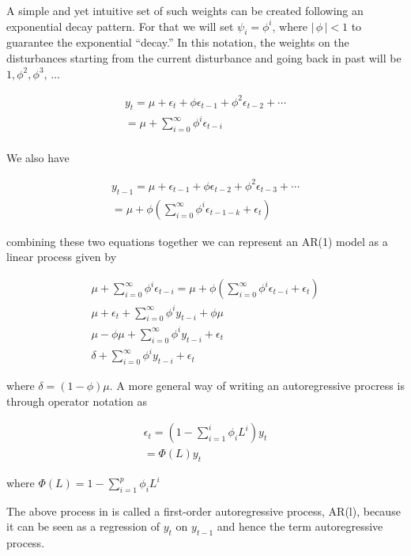 \documentclass[
  11pt,
]{article}
\begin{document}
A simple and yet intuitive set of such weights can be created following
an exponential decay pattern. For that we will set
\(\psi_{i} = \phi^{i}\), where \(\left|\,\phi\,\right| < 1\) to
guarantee the exponential ``decay.'' In this notation, the weights on
the disturbances starting from the current disturbance and going back in
past will be \(1, \phi^{2}, \phi^{3},\, \ldots\)

\begin{gather*}
y_{t} = \mu + \epsilon_{t} + \phi\epsilon_{t-1} + \phi^{2}\epsilon_{t-2} + \cdots\\[8pt]
= \mu + \sum\limits_{i=0}^{\infty}\phi^{i}\epsilon_{t-i}
\\[8pt]
\end{gather*}

We also have

\begin{gather*}
y_{t-1} = \mu + \epsilon_{t-1} + \phi\epsilon_{t-2} + \phi^{2}\epsilon_{t-3} + \cdots \\[8pt]
= \mu + \phi\left(\sum\limits_{i=0}^{\infty}\phi^{i}\epsilon_{t-1-k} + \epsilon_{t}\right)
\end{gather*}

combining these two equations together we can represent an AR(1) model
as a linear process given by

\begin{gather*}
\mu + \sum\limits_{i=0}^{\infty}\phi^{i}\epsilon_{t-i} = \mu + \phi\left(\sum\limits_{i=0}^{\infty}\phi^{i}\epsilon_{t-i} + \epsilon_{t}\right) \\[8pt]
\mu + \epsilon_{t} + \sum\limits_{i=0}^{\infty}\phi^{i}y_{t-i} + \phi\mu \\[8pt]
\mu - \phi\mu + \sum\limits_{i=0}^{\infty}\phi^{i}y_{t-i} + \epsilon_{t} \\[8pt]
\delta + \sum\limits_{i=0}^{\infty}\phi^{i}y_{t- i} + \epsilon_{t}
\end{gather*}

where \(\delta = (1 - \phi)\mu\). A more general way of writing an
autoregressive procress is through operator notation as

\begin{gather*}
\epsilon_{t} = \left(1 - \sum\limits_{i=1}^{i}\phi_{i}L^{i} \right)y_{t} \\[8pt]
 = \Phi(L)y_{t}
\end{gather*}

where \(\Phi(L) = 1 - \sum\limits_{i=1}^{p}\phi_{i}L^{i}\)

The above process in is called a first-order autoregressive process,
AR(l), because it can be seen as a regression of \(y_{t}\) on
\(y_{t-1}\) and hence the term autoregressive process.
\end{document}
